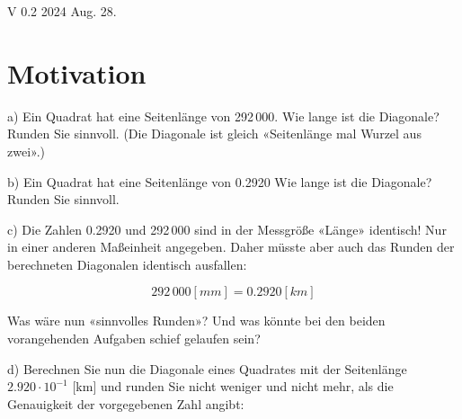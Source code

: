 
\renewcommand{\bbwAufgabenBlockID}{A1rnd}


\usepackage{amssymb} %
\renewcommand{\metaHeaderLine}{Runden}
\renewcommand{\arbeitsblattTitel}{Rationale Zahlen: Runden}

\arbeitsblattHeader{}

\begin{center}V 0.2 2024 Aug. 28. \end{center}


\section{Motivation}

a) Ein Quadrat hat eine Seitenlänge von 292\,000. Wie lange ist die
Diagonale? Runden Sie sinnvoll. (Die Diagonale ist gleich «Seitenlänge mal Wurzel aus zwei».)


b) Ein Quadrat hat eine Seitenlänge von 0.2920  Wie lange ist die
Diagonale? Runden Sie sinnvoll.


c) 
Die Zahlen 0.2920 und 292\,000 sind in der Messgröße «Länge» identisch! Nur in einer anderen
Maßeinheit angegeben. Daher müsste aber auch
das Runden der berechneten Diagonalen identisch ausfallen:

$$292\,000 [mm] = 0.2920 [km]$$

Was wäre nun «sinnvolles Runden»? Und was könnte bei den beiden
vorangehenden Aufgaben schief gelaufen sein?


d) Berechnen Sie nun die Diagonale eines Quadrates mit der Seitenlänge
$2.920\cdot{}10^{-1}$ [km] und runden Sie nicht weniger und nicht
mehr, als die Genauigkeit der vorgegebenen Zahl angibt:



